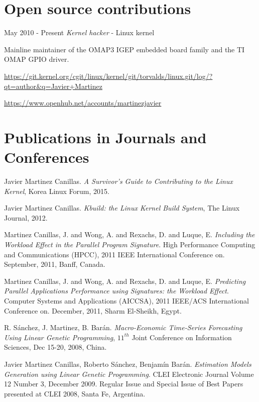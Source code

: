 \documentclass{simplecv}
\begin{document}
\section{Open source contributions}

\begin{topic}

\item[May 2010 - Present] \emph{Kernel hacker} - Linux kernel

Mainline maintainer of the OMAP3 IGEP embedded board family and the TI OMAP GPIO driver.

\url{https://git.kernel.org/cgit/linux/kernel/git/torvalds/linux.git/log/?qt=author&q=Javier+Martinez}

\url{https://www.openhub.net/accounts/martinezjavier}

\end{topic}

\section{Publications in Journals and Conferences}

\begin{thebibliography}{10}

\footnotesize

Javier Martinez Canillas. \emph{A Survivor's Guide to Contributing to the Linux Kernel}, Korea Linux Forum, 2015.

Javier Martinez Canillas. \emph{Kbuild: the Linux Kernel Build System}, The Linux Journal, 2012. 

Martinez Canillas, J. and Wong, A. and Rexachs, D. and Luque, E. \emph{Including the Workload Effect in the Parallel Program Signature}. High Performance Computing and Communications (HPCC), 2011 IEEE International Conference on. September, 2011, Banff, Canada.

Martinez Canillas, J. and Wong, A. and Rexachs, D. and Luque, E. \emph{Predicting Parallel Applications Performance using Signatures: the Workload Effect}. Computer Systems and Applications (AICCSA), 2011 IEEE/ACS International Conference on. December, 2011, Sharm El-Sheikh, Egypt.

R. Sánchez, J. Martinez, B. Barán. \emph{Macro-Economic Time-Series Forecasting Using Linear Genetic Programming}, $11^{th}$ Joint Conference on Information Sciences, Dec 15-20, 2008, China. 

Javier Martinez Canillas, Roberto Sánchez, Benjamín Barán. \emph{Estimation Models Generation using Linear Genetic Programming}. CLEI Electronic Journal Volume 12 Number 3, December 2009. Regular Issue and Special Issue of Best Papers presented at CLEI 2008, Santa Fe, Argentina.

\end{thebibliography}
\end{document}
